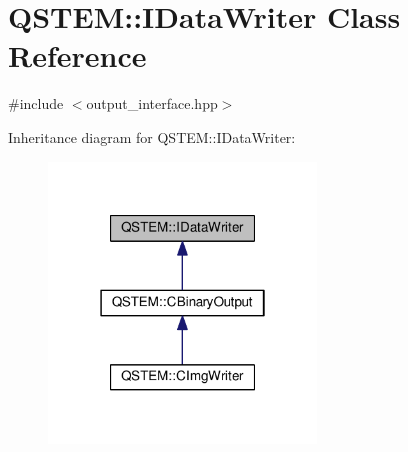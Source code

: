 \hypertarget{class_q_s_t_e_m_1_1_i_data_writer}{\section{Q\-S\-T\-E\-M\-:\-:I\-Data\-Writer Class Reference}
\label{class_q_s_t_e_m_1_1_i_data_writer}
}


{\ttfamily \#include $<$output\-\_\-interface.\-hpp$>$}



Inheritance diagram for Q\-S\-T\-E\-M\-:\-:I\-Data\-Writer\-:
\nopagebreak
\begin{figure}[H]
\begin{center}
\leavevmode
\includegraphics[width=202pt]{class_q_s_t_e_m_1_1_i_data_writer__inherit__graph}
\end{center}
\end{figure}
